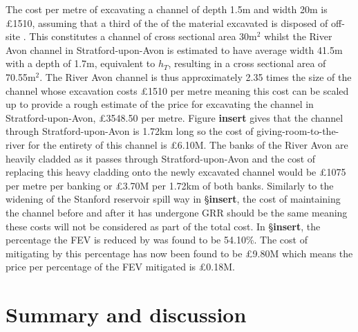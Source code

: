 \documentclass[11pt,a4paper]{article}
\begin{document}
\noindent The cost per metre of excavating a channel of depth 1.5m and width 20m is \pounds1510, assuming that a third of the of the material excavated is disposed of off-site \cite{cost1}. This constitutes a channel of cross sectional area 30m$^2$ whilst the River Avon channel in Stratford-upon-Avon is estimated to have average width 41.5m \cite{maps} with a depth of 1.7m, equivalent to $h_T$, resulting in a cross sectional area of 70.55m$^2$. The River Avon channel is thus approximately 2.35 times the size of the channel whose excavation costs \pounds1510 per metre meaning this cost can be scaled up to provide a rough estimate of the price for excavating the channel in Stratford-upon-Avon, \pounds3548.50 per metre. Figure \textbf{insert} gives that the channel through Stratford-upon-Avon is 1.72km long so the cost of giving-room-to-the-river for the entirety of this channel is \pounds6.10M. The banks of the River Avon are heavily cladded as it passes through Stratford-upon-Avon and the cost of replacing this heavy cladding onto the newly excavated channel would be \pounds1075 per metre per banking or \pounds3.70M per 1.72km of both banks. Similarly to the widening of the Stanford reservoir spill way in \S \textbf{insert}, the cost of maintaining the channel before and after it has undergone GRR should be the same meaning these costs will not be considered as part of the total cost. In \S \textbf{insert}, the percentage the FEV is reduced by was found to be 54.10\%. The cost of mitigating by this percentage has now been found to be \pounds9.80M which means the price per percentage of the FEV mitigated is \pounds0.18M.

\section{Summary and discussion}
\begin{figure}[ht!]
\hfill
{}
\caption{}
\end{figure}
\end{document}
